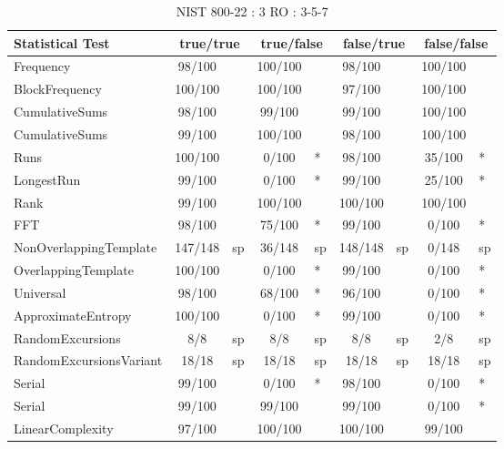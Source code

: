 \begin{table}[H]
\centering
\caption{NIST 800-22 : 3 RO : 3-5-7}
\label{tab:ch4_nist_22_3RO_15I}
\begin{tabular}{|l|c|l|c|l|c|l|c|l|}
\hline
\textbf{Statistical Test} & \multicolumn{2}{c|}{\textbf{true/true}} & \multicolumn{2}{c|}{\textbf{true/false}} & \multicolumn{2}{c|}{\textbf{false/true}} & \multicolumn{2}{c|}{\textbf{false/false}} \\ \hline
Frequency               &  98/100 &     & 100/100 &     &  98/100 &     & 100/100 &     \\ \hline
BlockFrequency          & 100/100 &     & 100/100 &     &  97/100 &     & 100/100 &     \\ \hline
CumulativeSums          &  98/100 &     &  99/100 &     &  99/100 &     & 100/100 &     \\ \hline
CumulativeSums          &  99/100 &     & 100/100 &     &  98/100 &     & 100/100 &     \\ \hline
Runs                    & 100/100 &     &   0/100 & *   &  98/100 &     &  35/100 & *   \\ \hline
LongestRun              &  99/100 &     &   0/100 & *   &  99/100 &     &  25/100 & *   \\ \hline
Rank                    &  99/100 &     & 100/100 &     & 100/100 &     & 100/100 &     \\ \hline
FFT                     &  98/100 &     &  75/100 & *   &  99/100 &     &   0/100 & *   \\ \hline
NonOverlappingTemplate  & 147/148 & sp  &  36/148 & sp  & 148/148 & sp  &   0/148 & sp  \\ \hline
OverlappingTemplate     & 100/100 &     &   0/100 & *   &  99/100 &     &   0/100 & *   \\ \hline
Universal               &  98/100 &     &  68/100 & *   &  96/100 &     &   0/100 & *   \\ \hline
ApproximateEntropy      & 100/100 &     &   0/100 & *   &  99/100 &     &   0/100 & *   \\ \hline
RandomExcursions        &     8/8 & sp  &     8/8 & sp  &     8/8 & sp  &     2/8 & sp  \\ \hline
RandomExcursionsVariant &   18/18 & sp  &   18/18 & sp  &   18/18 & sp  &   18/18 & sp  \\ \hline
Serial                  &  99/100 &     &   0/100 & *   &  98/100 &     &   0/100 & *   \\ \hline
Serial                  &  99/100 &     &  99/100 &     &  99/100 &     &   0/100 & *   \\ \hline
LinearComplexity        &  97/100 &     & 100/100 &     & 100/100 &     &  99/100 &     \\ \hline
\end{tabular}
\end{table}


